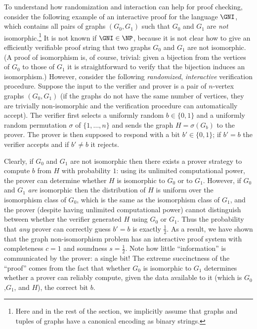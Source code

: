 To understand how randomization and interaction can help for proof checking, consider the following example of an interactive proof for the language $\GNI$, which contains all pairs of graphs $(G_0,G_1)$ such that $G_0$ and $G_1$ are \emph{not} isomorphic.\footnote{Here and in the rest of the section, we implicitly assume that graphs and tuples of graphs have a canonical encoding as binary strings.}
It is not known if $\GNI\in \NP$, because it is not clear how to give an efficiently verifiable proof string that two graphs $G_0$ and $G_1$ are not isomorphic. (A proof of isomorphism is, of course, trivial: given a bijection from the vertices of $G_0$ to those of $G_1$ it is straightforward to verify that the bijection induces an isomorphism.) However, consider the following \emph{randomized}, \emph{interactive} verification procedure. Suppose the input to the verifier and prover is a pair of $n$-vertex graphs $(G_0,G_1)$ (if the graphs do not have the same number of vertices, they are trivially non-isomorphic and the verification procedure can automatically accept). The verifier first selects a uniformly random $b\in \{0,1\}$ and a uniformly random permutation $\sigma$ of $\{1,\ldots,n\}$ and sends the graph $H = \sigma( G_b)$ to the prover. The prover is then supposed to respond with a bit $b'\in \{0,1\}$; if $b'=b$  the verifier accepts and if $b'\neq b$ it rejects. 

Clearly, if $G_0$ and $G_1$ are not isomorphic then there exists a prover {strategy} to compute $b$ from $H$ with probability $1$: using its unlimited computational power, the prover can determine whether $H$ is isomorphic to $G_0$ or to $G_1$. However, if $G_0$ and $G_1$ \emph{are} isomorphic then the distribution of $H$ is uniform over the isomorphism class of $G_0$, which is the same as the isomorphism class of $G_1$, and the prover (despite having unlimited computational power) cannot distinguish between whether the verifier generated $H$ using $G_0$ or $G_1$. Thus the probability that \emph{any} prover can correctly guess $b'=b$ is exactly $\frac{1}{2}$. As a result, we have shown that the graph non-isomorphism problem has an interactive proof system with completeness $c=1$ and soundness $s=\frac{1}{2}$. Note how little ``information'' is communicated by the prover: a single bit!
The extreme succinctness of the ``proof'' comes from the fact that whether $G_0$ is isomorphic to $G_1$ determines whether a prover can reliably compute, given the data available to it (which is $G_0$,$G_1$, and $H$), the correct bit $b$.

